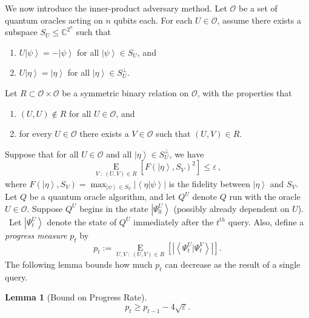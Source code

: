 \documentclass[10pt]{article}
\newtheorem{lemma}[theorem]{Lemma}
\theoremstyle{definition}
\numberwithin{equation}{section}
\begin{document}
We now introduce the inner-product adversary method. Let $\mathcal{O}$ be a
set of quantum oracles acting on $n$ qubits each. For each $U\in\mathcal{O}%
$, assume there exists a subspace $S_{U}\leq\mathbb{C}^{2^{n}}$ such that

\begin{enumerate}
\item[(i)] $U\left\vert \psi\right\rangle =-\left\vert \psi\right\rangle
$ for all $\left\vert \psi\right\rangle \in S_{U}$, and

\item[(ii)] $U\left\vert \eta\right\rangle =\left\vert \eta\right\rangle
$ for all $\left\vert \eta\right\rangle \in S_{U}^{\bot}$.
\end{enumerate}

Let $R\subset\mathcal{O}\times\mathcal{O}$ be a symmetric binary relation on
$\mathcal{O}$, with the properties that

\begin{enumerate}
\item[(i)] $\left(  U,U\right)  \notin R$ for all $U\in\mathcal{O}$, and

\item[(ii)] for every $U\in\mathcal{O}$ there exists a $V\in\mathcal{O}%
$ such that $\left(  U,V\right)  \in R$.\
\end{enumerate}

Suppose that for all $U\in\mathcal{O}$ and all $\left\vert \eta\right\rangle
\in S_{U}^{\bot}$, we have%
\[
\operatorname*{E}_{V~:~\left(  U,V\right)  \in R}\left[  F\left(  \left\vert
\eta\right\rangle ,S_{V}\right)  ^{2}\right]  \leq\varepsilon\,,
\]
where $F\left(  \left\vert \eta\right\rangle ,S_{V}\right)  =\max_{\left\vert
\psi\right\rangle \in S_{V}}\left\vert \left\langle \eta|\psi\right\rangle
\right\vert $ is the fidelity between $\left\vert \eta\right\rangle $ and
$S_{V}$. Let $Q$ be a quantum oracle algorithm, and let $Q^{U}$ denote $Q$
run with the oracle $U\in\mathcal{O}$. Suppose $Q^{U}$ begins in the state
$\left\vert \Psi_{0}^{U}\right\rangle $ (possibly already dependent on $U$).
\ Let $\left\vert \Psi_{t}^{U}\right\rangle $ denote the state of $Q^{U}%
$ immediately after the $t^{th}$ query. Also, define a \emph{progress
measure} $p_{t}$ by%
\[
p_{t}:=\operatorname*{E}_{U,V~:~\left(  U,V\right)  \in R}\left[  \left\vert
\left\langle \Psi_{t}^{U}|\Psi_{t}^{V}\right\rangle \right\vert \right]  .
\]
The following lemma bounds how much $p_{t}$ can decrease as the result of a
single query.

\begin{lemma}
[Bound on Progress Rate]\label{innerprod}%
\[
p_{t}\geq p_{t-1}-4\sqrt{\varepsilon}.
\]

\end{lemma}
\end{document}
